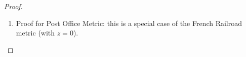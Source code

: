 \begin{proof}
\begin{enumerate}
  \item Proof for Post Office Metric: this is a special case
        of the French Railroad metric (with $z=0$).



\end{enumerate}
\end{proof}



